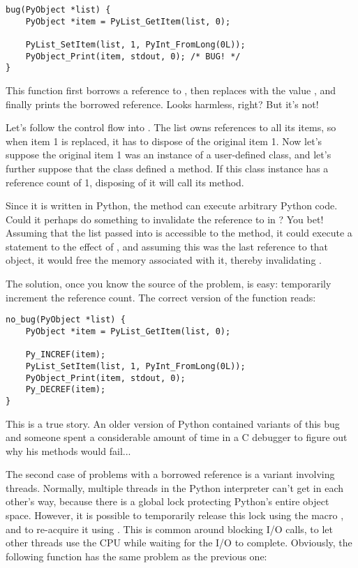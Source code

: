 \documentclass{manual}
\begin{document}
\begin{verbatim}
bug(PyObject *list) {
    PyObject *item = PyList_GetItem(list, 0);

    PyList_SetItem(list, 1, PyInt_FromLong(0L));
    PyObject_Print(item, stdout, 0); /* BUG! */
}
\end{verbatim}

This function first borrows a reference to , then
replaces  with the value , and finally prints
the borrowed reference.  Looks harmless, right?  But it's not!

Let's follow the control flow into .  The list
owns references to all its items, so when item 1 is replaced, it has
to dispose of the original item 1.  Now let's suppose the original
item 1 was an instance of a user-defined class, and let's further
suppose that the class defined a  method.  If this
class instance has a reference count of 1, disposing of it will call
its  method.

Since it is written in Python, the  method can execute
arbitrary Python code.  Could it perhaps do something to invalidate
the reference to  in ?  You bet!  Assuming
that the list passed into  is accessible to the
 method, it could execute a statement to the effect of
, and assuming this was the last reference to that
object, it would free the memory associated with it, thereby
invalidating .

The solution, once you know the source of the problem, is easy:
temporarily increment the reference count.  The correct version of the
function reads:

\begin{verbatim}
no_bug(PyObject *list) {
    PyObject *item = PyList_GetItem(list, 0);

    Py_INCREF(item);
    PyList_SetItem(list, 1, PyInt_FromLong(0L));
    PyObject_Print(item, stdout, 0);
    Py_DECREF(item);
}
\end{verbatim}

This is a true story.  An older version of Python contained variants
of this bug and someone spent a considerable amount of time in a C
debugger to figure out why his  methods would fail...

The second case of problems with a borrowed reference is a variant
involving threads.  Normally, multiple threads in the Python
interpreter can't get in each other's way, because there is a global
lock protecting Python's entire object space.  However, it is possible
to temporarily release this lock using the macro
, and to re-acquire it using
.  This is common around blocking I/O
calls, to let other threads use the CPU while waiting for the I/O to
complete.  Obviously, the following function has the same problem as
the previous one:
\end{document}
